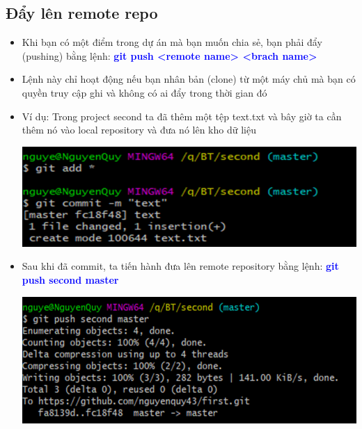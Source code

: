 \documentclass[12pt,a4paper]{report}
\begin{document}
\subsection{Đẩy lên remote repo}
\begin{itemize}
\item Khi bạn có một điểm trong dự án mà bạn muốn chia sẻ, bạn phải đẩy (pushing) bằng lệnh: \textcolor{blue}{\bf git push <remote name> <brach name> }
\item Lệnh này chỉ hoạt động nếu bạn nhân bản (clone) từ một máy chủ mà bạn có quyền truy cập ghi và không có ai đẩy trong thời gian đó
\item Ví dụ: Trong project second ta đã thêm một tệp text.txt và bây giờ ta cần thêm nó vào local repository và đưa nó lên kho dữ liệu

	\includegraphics[width=0.8\linewidth]{screenshot038}

	\label{fig:screenshot038}

\item Sau khi đã commit, ta tiến hành đưa lên remote repository bằng lệnh: \textcolor{blue}{\bf git push second master}

	\includegraphics[width=0.8\linewidth]{screenshot039}

	\label{fig:screenshot039}
\end{itemize}	
\end{document}
